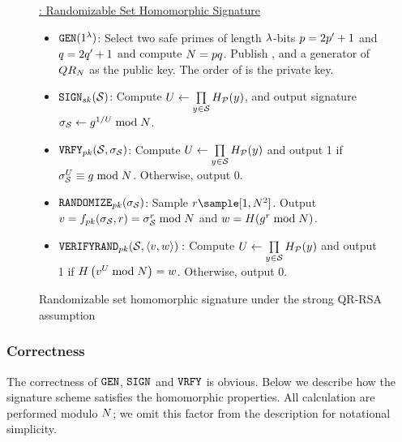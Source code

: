 \begin{figure}
\begin{mdframed}
\footnotesize
\underline{\ourSigScheme: Randomizable Set Homomorphic Signature}
\begin{itemize}[leftmargin = 1.5em]
	\item $\keyGen(1^{\secParam})$: Select two safe primes of length 
	$\lambda$-bits $\safePrime[1] = 2 \sgPrime[1] + 1$ and 
	$\safePrime[2] = 2 \sgPrime[2] + 1$ and compute $\rsaMod = \safePrime[1] 
	\safePrime[2]$. Publish \rsaMod, and a generator \qrGen of $QR_{N}$ as the public key. 
	The order of \qrGroup is the private key. 
	
	\item \textbf{$\signingAlg[\privKey](\genericSetVar)$}: Compute $\accSet \assign \accSetDefn$, and output signature 
	 $\genericSig[\genericSetVar] \assign 
	\qrGen^{1/\accSet} \bmod \rsaMod$. 

	\item \textbf{$\verify[\pubKey](\genericSetVar, \genericSig[\genericSetVar])$}: Compute $\accSet \assign \accSetDefn$ and 
	output 1 if
	$\genericSig[\genericSetVar]^{\accSet} \equiv \qrGen \bmod 
	\rsaMod$. Otherwise, output 0. 
			
	\item \textbf{$\randomize[\pubKey](\genericSig[\genericSetVar])$}: Sample $\genericRand \sample \nats[1][\rsaMod^2]$. 
	Output $\genericSigPair[1] = \randomizeFn[\pubKey](\genericSig[\genericSetVar], \genericRand) = 
	\genericSig[\genericSetVar]^{\genericRand} \bmod \rsaMod$ and $\genericSigPair[2] = 
	\ro(\qrGen^{\genericRand} \bmod \rsaMod)$. 
	
	
	\item \textbf{$\verifyRand[\pubKey](\genericSetVar, \genericSigPair):$} Compute $\accSet \assign \accSetDefn$ and 
	output 1 if $\ro\left(\genericSigPair[1]^{\accSet} \bmod \rsaMod\right) = \genericSigPair[2]$. Otherwise, output 0. 
		
\end{itemize}
\end{mdframed}
\vspace{-0.3cm}
\caption{Randomizable set homomorphic signature under the strong QR-RSA assumption\label{sig:construction}}
\end{figure}

\subsubsection{Correctness}
%
The correctness of $\keyGen$, $\signingAlg$ and $\verify$ is obvious. Below we describe how the signature scheme satisfies the homomorphic properties. All calculation are performed modulo $N$; we omit this factor from the description for notational simplicity. 

